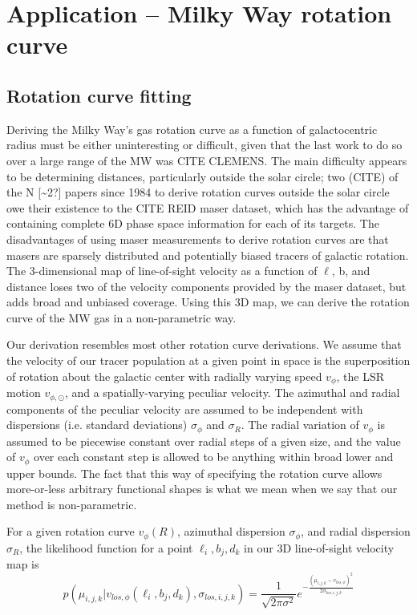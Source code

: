 \section{Application -- Milky Way rotation curve}
\label{sec:rotation_curve}

\subsection{Rotation curve fitting}

Deriving the Milky Way's gas rotation curve as a function of galactocentric radius must be either uninteresting or difficult, given that the last work to do so over a large range of the MW was CITE CLEMENS. The main difficulty appears to be determining distances, particularly outside the solar circle; two (CITE) of the N [\sim 2?] papers since 1984 to derive rotation curves outside the solar circle owe their existence to the CITE REID maser dataset, which has the advantage of containing complete 6D phase space information for each of its targets. The disadvantages of using maser measurements to derive rotation curves are that masers are sparsely distributed and potentially biased tracers of galactic rotation. The 3-dimensional map of line-of-sight velocity as a function of $\ell$, b, and distance loses two of the velocity components provided by the maser dataset, but adds broad and unbiased coverage. Using this 3D map, we can derive the rotation curve of the MW gas in a non-parametric way.

Our derivation resembles most other rotation curve derivations. We assume that the velocity of our tracer population at a given point in space is the superposition of rotation about the galactic center with radially varying speed $v_\phi$, the LSR motion $v_{\phi, \odot}$, and a spatially-varying peculiar velocity. The azimuthal and radial components of the peculiar velocity are assumed to be independent with dispersions (i.e. standard deviations) $\sigma_\phi$ and $\sigma_R$. The radial variation of $v_\phi$ is assumed to be piecewise constant over radial steps of a given size, and the value of $v_\phi$ over each constant step is allowed to be anything within broad lower and upper bounds. The fact that this way of specifying the rotation curve allows more-or-less arbitrary functional shapes is what we mean when we say that our method is non-parametric.

For a given rotation curve $v_\phi(R)$, azimuthal dispersion $\sigma_\phi$, and radial dispersion $\sigma_R$, the likelihood function for a point $\ell_i,b_j,d_k$ in our 3D line-of-sight velocity map is 
\begin{equation}
\label{eqn:rotcuve_likelihood}
p(\mu_{i,j,k} \vert v_{los, \phi}(\ell_i, b_j, d_k), \sigma_{los, i, j, k}) = \frac{1}{\sqrt{2 \pi \sigma^2}} e^{- \frac{(\mu_{i,j,k} - v_{los, \phi})^2}{2 \sigma_{los, i, j ,k}}}
\end{equation}

